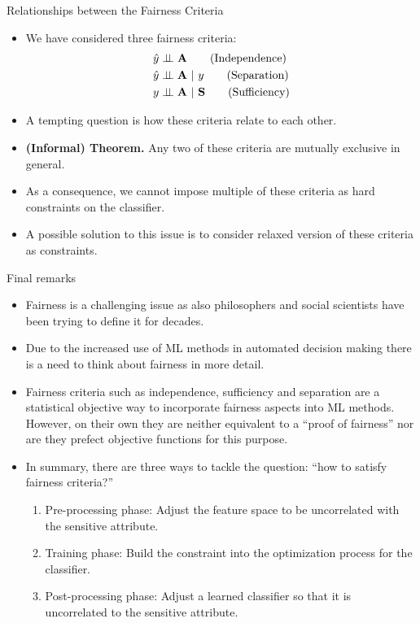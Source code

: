 \begin{vbframe}{Relationships between the Fairness Criteria}
	\small{
		\begin{itemize}
			\item We have considered three fairness criteria:
			\begin{align*}
%				
				\yh &\indep \sens \tag{Independence}	\\
%				
				\yh &\indep \sens ~|~ y  \tag{Separation}\\ 
%				
				y &\indep \sens ~|~ 	\mathbf{S} \tag{Sufficiency}
%				
			\end{align*}
			\item A tempting question is how these criteria relate to each other. 
			 
			\item \textbf{(Informal) Theorem.} Any two of these criteria are mutually exclusive in general.
%			 

			\item As a consequence, we cannot impose multiple of these criteria as hard constraints on the classifier.
%			
			\item A possible solution to this issue is to consider relaxed version of these criteria as constraints.
%			
		\end{itemize}
	}
\end{vbframe}




\begin{vbframe}{Final remarks}
	\small
		\begin{itemize}
			\item Fairness is a challenging issue as also philosophers and social scientists have been trying to define it for decades.
%			
			\item Due to the increased use of ML methods in automated decision making there is a need to think about fairness in more detail.
%			
			\item  Fairness criteria such as independence, sufficiency and separation are a statistical objective way to incorporate fairness aspects into ML methods. However, on their own they are neither equivalent to a ``proof of fairness'' nor are they prefect objective functions for this purpose.
%			
			\item In summary, there are three ways to tackle the question: ``how to satisfy fairness criteria?''
%			
			\begin{enumerate}
				\small
				\item Pre-processing phase: Adjust the feature space to be uncorrelated
				with the sensitive attribute.
				\item Training phase: Build the constraint into the optimization process
				for the classifier.
				\item Post-processing phase: Adjust a learned classifier so that it is uncorrelated to the sensitive attribute.
			\end{enumerate}
			
		\end{itemize}
	
\end{vbframe}

%
\endlecture

